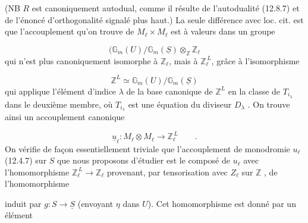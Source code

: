 
(NB $R$ est canoniquement autodual, comme il résulte de l'autodualité (12.8.7) et de l'énoncé d'orthogonalité signalé plus haut.) La seule différence avec loc. cit. est que l'accouplement qu'on trouve de $M_\ell \times M_\ell$ est à valeurs dans un groupe

\begin{equation*}
(\mathbb{G}_m(U)/\mathbb{G}_m(\underline{S}) \otimes_{\mathbb{Z}} \mathbb{Z}_\ell
\end{equation*}
qui n'est plus canoniquement isomorphe à $\mathbb{Z}_\ell$, mais à $\mathbb{Z}_\ell^{\,L}$, grâce à l'isomorphisme

\begin{equation}\tag{12.8.10}
\mathbb{Z}^L \simeq \mathbb{G}_m(U)/\mathbb{G}_m(\underline{S})
\end{equation}
qui applique l'élément d'indice $\lambda$ de la base canonique de $\mathbb{Z}^L$ en la classe de $T_{i_\lambda}$ dans le deuxième membre, où $T_{i_\lambda}$ est une équation du diviseur $D_\lambda$ . On trouve ainsi un accouplement canonique

\begin{equation}\tag{12.8.11}
\underline{u}_\ell : M_\ell \otimes M_\ell \longrightarrow \mathbb{Z}_\ell^{\,L} \qquad .
\end{equation}
On vérifie de façon essentiellement triviale que l'accouplement de monodromie $u_\ell$ (12.4.7) sur $S$ que nous proposons d'étudier est le composé de $u_\ell$ avec l'homomorphisme $\mathbb{Z}_\ell^{\,L} \longrightarrow \mathbb{Z}_\ell$ provenant, par tensorisation avec $Z_\ell$ sur $\mathbb{Z}$ , de l'homomorphisme

\begin{center}
\end{center}
induit par $g : S \longrightarrow \underline{S}$ (envoyant $\eta$ dans $U$). Cet homomorphisme est donné par un élément


